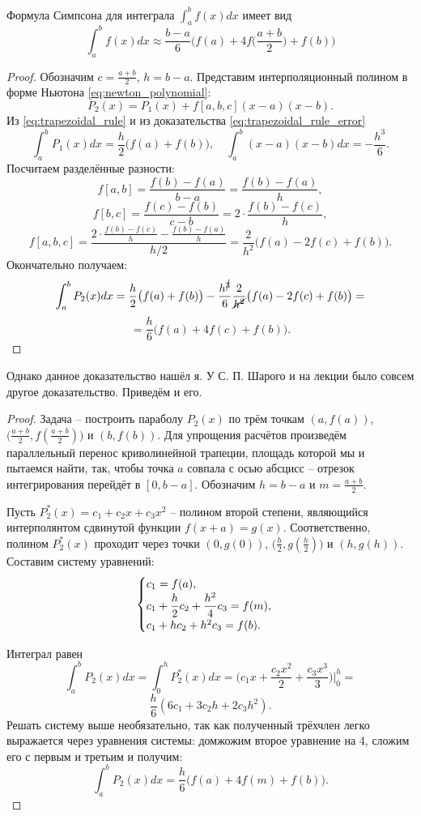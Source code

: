 \documentclass[../main.tex]{subfile}
\begin{document}
\begin{theorem}
	Формула Симпсона для интеграла $\int_a^b f(x)dx$ имеет
	вид
	\[\boxed{\int_a^b f(x)dx\approx\frac{b-a}{6}\Big(f(a)+4f\big(\frac{a+b}
	{2}\big)+f(b)\Big)}\]
\end{theorem}

\begin{proof}
	Обозначим $c=\frac{a+b}{2}$, $h=b-a$. Представим интерполяционный полином
	в форме Ньютона
	\eqref{eq:newton_polynomial}:
	\[P_2(x)=P_1(x)+f[a,b,c](x-a)(x-b).\]
	Из \eqref{eq:trapezoidal_rule} и из доказательства
	\eqref{eq:trapezoidal_rule_error}
	\[\int_a^b P_1(x)dx=\frac{h}{2}\big(f(a)+f(b)\big),\quad\int_a^b (x-a)
	(x-b)dx=-\frac{h^3}{6}.\]
	Посчитаем разделённые разности:
	\[f[a,b]=\frac{f(b)-f(a)}{b-a}=\frac{f(b)-f(a)}{h},\]
	\[f[b,c]=\frac{f(c)-f(b)}{c-b}=2\cdot\frac{f(b)-f(c)}{h},\]
	\[f[a,b,c]=\frac{2\cdot\frac{f(b)-f(c)}{h}-\frac{f(b)-f(a)}{h}}{h/2}=
	\frac{2}{h^2}\big(f(a)-2f(c)+f(b)\big).\]
	Окончательно получаем:
	\[\int_a^b P_2(x)dx=\frac{h}{2}\big(f(a)+f(b)\big)-\frac{h^{\cancel{3}}}
	{6}\frac{2}{\cancel{h^2}}\big(f(a)-2f(c)+f(b)\big)=\]
	\[=\frac{h}{6}\big(f(a)+4f(c)+f(b)\big).\]
\end{proof}

Однако данное доказательство нашёл я. У С. П. Шарого и на лекции было совсем
другое доказательство. Приведём и его.

\begin{proof}
	Задача -- построить параболу $P_2(x)$ по трём точкам $(a,f(a))$,
	$\big(\frac{a+b}{2},f(\frac{a+b}{2})\big)$ и $(b,f(b))$. Для упрощения
	расчётов произведём параллельный перенос криволинейной трапеции, площадь
	которой мы и пытаемся найти, так, чтобы точка $a$ совпала с осью
	абсцисс -- отрезок интегрирования перейдёт в $[0,b-a]$. Обозначим
	$h=b-a$ и $m=\frac{a+b}{2}$.

	Пусть $P_2^*(x)=c_1+c_2x+c_3x^2$ -- полином второй степени, являющийся
	интерполянтом сдвинутой функции $f(x+a)=g(x)$. Соответственно, полином
	$P_2^*(x)$ проходит через точки $(0,g(0))$, $\big(\frac{h}{2},
	g(\frac{h}{2})\big)$ и $(h,g(h))$. Составим систему уравнений:
	\begin{equation*}
		\begin{cases}
			c_1 = f(a), \\
			c_1 + \mathlarger{\frac{h}{2}}c_2 + \mathlarger{\frac
				{h^2}{4}}c_3 = f(m), \\
			c_1 + h c_2 + h^2 c_3 = f(b). \\
		\end{cases}
	\end{equation*}

	Интеграл равен
	\[\int_a^b P_2(x)dx=\int_0^h P_2^*(x)dx=\Big(c_1x+\frac{c_2x^2}{2}+
	\frac{c_3x^3}{3}\Big)\Big|_0^h=\]
	\[\frac{h}{6}(6c_1+3c_2h+2c_3h^2).\]
	Решать систему выше необязательно, так как полученный трёхчлен легко
	выражается через уравнения системы: домжожим второе уравнение на 4,
	сложим его с первым и третьим и получим:
	\[\int_a^b P_2(x)dx=\frac{h}{6}\big(f(a)+4f(m)+f(b)\big).\]
\end{proof}
\end{document}
